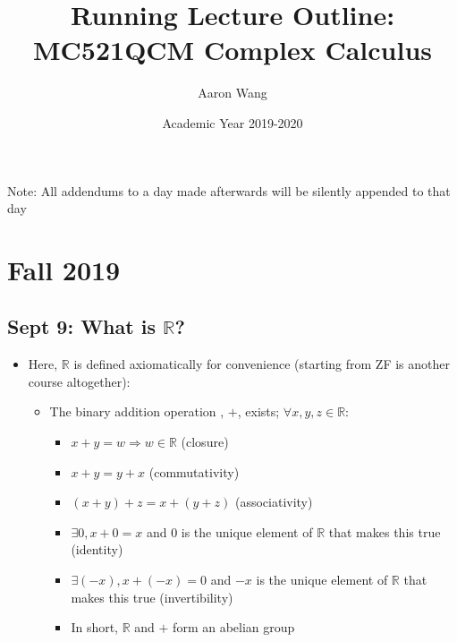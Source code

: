 \documentclass[10pt, oneside]{article}
\title{Running Lecture Outline: MC521QCM Complex Calculus}
\author{Aaron Wang}
\date{Academic Year 2019-2020}
\newcommand{\R}{\mathbb{R}}
\begin{document}
\maketitle
Note: All addendums to a day made afterwards will be silently appended to that day
\tableofcontents

\vspace{.25in}

\section{Fall 2019}

\subsection{Sept 9: What is $\R$?}
\begin{itemize}
    \item Here, $\R$ is defined axiomatically for convenience (starting from ZF is another course altogether):
    \begin{itemize}
        \item The binary addition operation , $+$, exists; $\forall x,y,z\in\R$:
        \begin{itemize}
            \item $x+y=w \Rightarrow w\in \R$ (closure)
            \item $x+y=y+x$  (commutativity)
            \item $(x+y)+z=x+(y+z)$  (associativity)
            \item $\exists 0,x+0=x$  and 0 is the unique element of $\R$ that makes this true (identity)
            \item $\exists (-x), x+(-x)=0$  and $-x$ is the unique element of $\R$ that makes this true (invertibility)
            \item In short, $\R$ and $+$ form an abelian group
        \end{itemize}
    \end{itemize}
\end{itemize}
\end{document}
